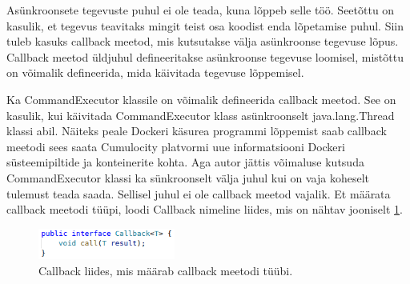 \documentclass[12pt]{article}
\begin{document}
  Asünkroonsete tegevuste puhul ei ole teada, kuna lõppeb selle töö. Seetõttu on
  kasulik, et tegevus teavitaks mingit teist osa koodist enda lõpetamise puhul.
  Siin tuleb kasuks callback meetod, mis kutsutakse välja asünkroonse tegevuse
  lõpus. Callback meetod üldjuhul defineeritakse asünkroonse tegevuse loomisel,
  mistõttu on võimalik defineerida, mida käivitada tegevuse lõppemisel.
 
  Ka CommandExecutor klassile on võimalik defineerida callback meetod. See on
  kasulik, kui käivitada CommandExecutor klass asünkroonselt java.lang.Thread
  klassi abil. Näiteks peale Dockeri käsurea programmi lõppemist saab callback
  meetodi sees saata Cumulocity platvormi uue informatsiooni Dockeri
  süsteemipiltide ja konteinerite kohta.
  Aga autor jättis võimaluse kutsuda CommandExecutor klassi
  ka sünkroonselt välja juhul kui on vaja koheselt tulemust teada saada.
  Sellisel juhul ei ole callback meetod vajalik. Et määrata
  callback meetodi tüüpi, loodi Callback nimeline liides, mis on nähtav
  jooniselt \ref{fig:dockerdriver_callback}.
 
 
  \begin{figure} [ht] %
  \begin{center}
  \includegraphics[width=0.4\textwidth]{dockerdriver_callback}
  \caption{Callback liides, mis määrab callback meetodi tüübi.}
  \label{fig:dockerdriver_callback}
  \end{center}
  \end{figure}
  
  \FloatBarrier
 
 
 
 
\end{document}
